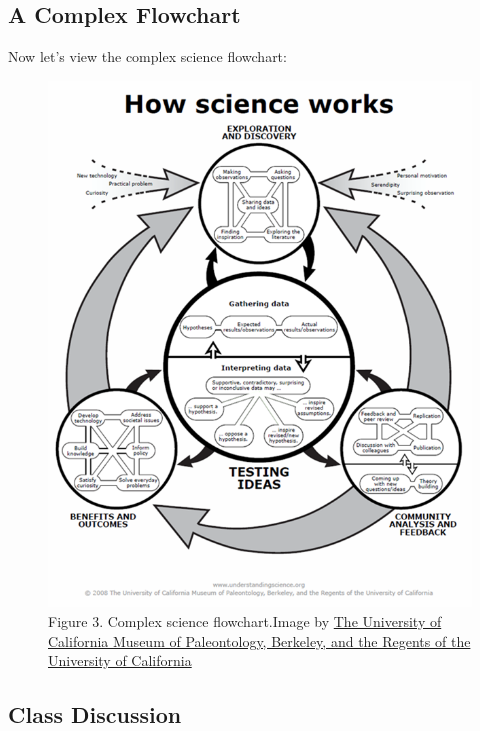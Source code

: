 \documentclass[
]{book}
\begin{document}
\hypertarget{a-complex-flowchart}{%
\subsection*{A Complex Flowchart}\label{a-complex-flowchart}}

Now let's view the complex science flowchart:

\begin{figure}
\centering
\includegraphics{figures_images/Lab2a-Fig3.png}
\caption{Figure 3. Complex science flowchart.Image by \href{www.understandingscience.org}{The University of California Museum of Paleontology, Berkeley, and the Regents of the University of California}}
\end{figure}

\hypertarget{class-discussion}{%
\subsection*{Class Discussion}\label{class-discussion}}
\end{document}
